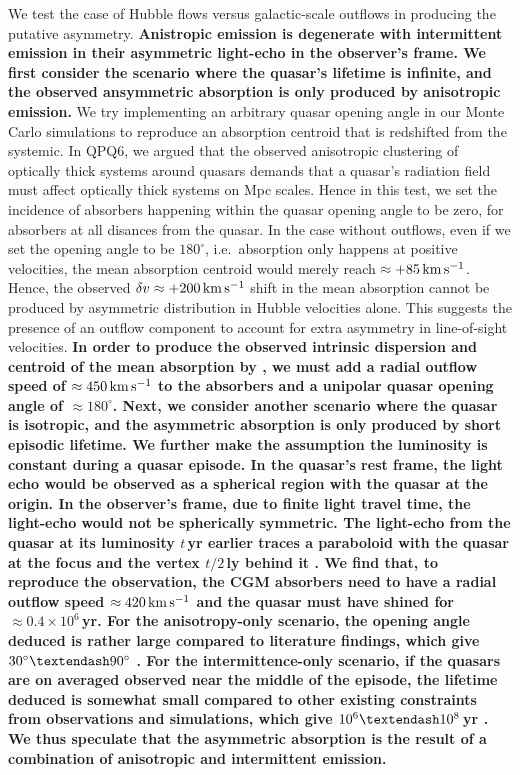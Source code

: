 \documentclass[iop]{emulateapj}
\begin{document}
We test the case of Hubble flows versus galactic-scale outflows in producing the putative
asymmetry.
{\bf
Anistropic emission is degenerate with intermittent emission in their asymmetric
light-echo in the observer's frame. We first consider the scenario where
the quasar's lifetime is infinite, and the observed ansymmetric absorption is only produced by
anisotropic emission.}
We try implementing an arbitrary quasar opening angle in our Monte Carlo simulations to
reproduce an absorption centroid that is redshifted from the systemic. In QPQ6, we argued that
the observed anisotropic clustering of optically thick systems around quasars demands that a quasar's
radiation field must affect optically thick systems on Mpc scales. Hence in this test, we set the
incidence of absorbers happening within the quasar opening angle to be zero, for absorbers at all
disances from the quasar. In the case without
outflows, even if we set the opening angle to be $180^\circ$, i.e.\ absorption only happens at
positive velocities, the mean absorption centroid would merely reach $\approx+85\,{\rm km\,s^{-1}}$.
Hence, the observed $\delta v\approx+200\,{\rm km\,s^{-1}}$ shift in the mean absorption cannot be
produced by asymmetric distribution in Hubble velocities alone. This suggests the presence of an
outflow component to account for extra asymmetry in line-of-sight velocities.
{\bf In order to produce the observed intrinsic dispersion and centroid of the mean absorption by
, we must add a radial outflow speed of $\approx450\,{\rm km\,s^{-1}}$ to the absorbers
and a unipolar quasar opening angle of $\approx180^\circ$.
Next, we consider another scenario where the quasar is isotropic, and the asymmetric absorption
is only produced by short episodic lifetime. We further make the assumption the luminosity is
constant during a quasar episode. In the quasar's rest frame, the light echo
would be observed as a spherical region with the quasar at the origin. In the observer's frame, due
to finite light travel time, the light-echo would not be spherically symmetric. The
light-echo from the quasar at its luminosity $t$\,yr earlier traces a paraboloid
with the quasar at the focus and the vertex $t/2$\,ly behind it \citep{Adelberger04,VisbalCroft08}.
We find that, to reproduce the observation, the CGM absorbers need to have a radial outflow speed
$\approx420\,{\rm km\,s^{-1}}$ and the quasar must have shined for $\approx0.4\times10^6$\,yr.
For the anisotropy-only scenario, the opening angle deduced is rather large compared to literature
findings, which give $30^\circ\textendash90^\circ$ \citep[e.g.,][]{TrainorSteidel13,Borisova+16}.
For the intermittence-only scenario, if the quasars are on
averaged observed near the middle of the episode, the lifetime deduced is somewhat small compared
to other existing constraints from observations and simulations, which give
$10^6\textendash10^8$\,yr \citep[e.g.,][]{Martini04,Hopkins+05}.
We thus speculate that the asymmetric absorption is the result of a combination of anisotropic
and intermittent emission.
}
\end{document}
